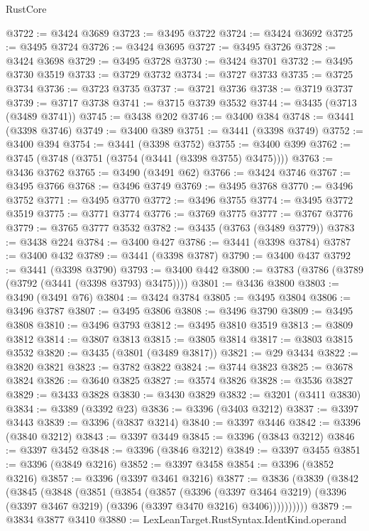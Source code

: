 \begin{lexlean}{RustCore}
\begin{coremodule}
@3722 := @3424 @3689
@3723 := @3495 @3722
@3724 := @3424 @3692
@3725 := @3495 @3724
@3726 := @3424 @3695
@3727 := @3495 @3726
@3728 := @3424 @3698
@3729 := @3495 @3728
@3730 := @3424 @3701
@3732 := @3495 @3730 @3519
@3733 := @3729 @3732
@3734 := @3727 @3733
@3735 := @3725 @3734
@3736 := @3723 @3735
@3737 := @3721 @3736
@3738 := @3719 @3737
@3739 := @3717 @3738
@3741 := @3715 @3739 @3532
@3744 := @3435 (@3713 (@3489 @3741))
@3745 := @3438 @202
@3746 := @3400 @384
@3748 := @3441 (@3398 @3746)
@3749 := @3400 @389
@3751 := @3441 (@3398 @3749)
@3752 := @3400 @394
@3754 := @3441 (@3398 @3752)
@3755 := @3400 @399
@3762 := @3745 (@3748 (@3751 (@3754 (@3441 (@3398 @3755) @3475))))
@3763 := @3436 @3762
@3765 := @3490 (@3491 @62)
@3766 := @3424 @3746
@3767 := @3495 @3766
@3768 := @3496 @3749
@3769 := @3495 @3768
@3770 := @3496 @3752
@3771 := @3495 @3770
@3772 := @3496 @3755
@3774 := @3495 @3772 @3519
@3775 := @3771 @3774
@3776 := @3769 @3775
@3777 := @3767 @3776
@3779 := @3765 @3777 @3532
@3782 := @3435 (@3763 (@3489 @3779))
@3783 := @3438 @224
@3784 := @3400 @427
@3786 := @3441 (@3398 @3784)
@3787 := @3400 @432
@3789 := @3441 (@3398 @3787)
@3790 := @3400 @437
@3792 := @3441 (@3398 @3790)
@3793 := @3400 @442
@3800 := @3783 (@3786 (@3789 (@3792 (@3441 (@3398 @3793) @3475))))
@3801 := @3436 @3800
@3803 := @3490 (@3491 @76)
@3804 := @3424 @3784
@3805 := @3495 @3804
@3806 := @3496 @3787
@3807 := @3495 @3806
@3808 := @3496 @3790
@3809 := @3495 @3808
@3810 := @3496 @3793
@3812 := @3495 @3810 @3519
@3813 := @3809 @3812
@3814 := @3807 @3813
@3815 := @3805 @3814
@3817 := @3803 @3815 @3532
@3820 := @3435 (@3801 (@3489 @3817))
@3821 := @29 @3434
@3822 := @3820 @3821
@3823 := @3782 @3822
@3824 := @3744 @3823
@3825 := @3678 @3824
@3826 := @3640 @3825
@3827 := @3574 @3826
@3828 := @3536 @3827
@3829 := @3433 @3828
@3830 := @3430 @3829
@3832 := @3201 (@3411 @3830)
@3834 := @3389 (@3392 @23)
@3836 := @3396 (@3403 @3212)
@3837 := @3397 @3443
@3839 := @3396 (@3837 @3214)
@3840 := @3397 @3446
@3842 := @3396 (@3840 @3212)
@3843 := @3397 @3449
@3845 := @3396 (@3843 @3212)
@3846 := @3397 @3452
@3848 := @3396 (@3846 @3212)
@3849 := @3397 @3455
@3851 := @3396 (@3849 @3216)
@3852 := @3397 @3458
@3854 := @3396 (@3852 @3216)
@3857 := @3396 (@3397 @3461 @3216)
@3877 := @3836
    (@3839
      (@3842
        (@3845
          (@3848
            (@3851
              (@3854
                (@3857
                  (@3396
                    (@3397 @3464 @3219)
                    (@3396 (@3397 @3467 @3219) (@3396 (@3397 @3470 @3216) @3406))))))))))
@3879 := @3834 @3877 @3410
@3880 := LexLeanTarget.RustSyntax.IdentKind.operand

\end{coremodule}
\end{lexlean}
